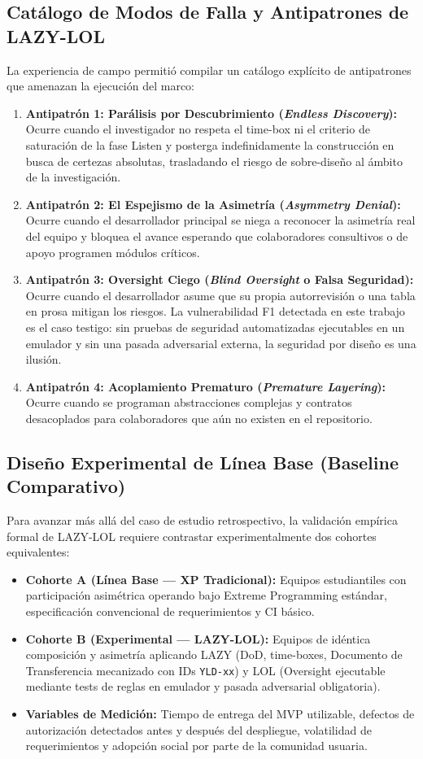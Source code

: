 \documentclass[14pt,a4paper,oneside]{extbook}
\begin{document}
\subsection{Catálogo de Modos de Falla y Antipatrones de LAZY-LOL}

La experiencia de campo permitió compilar un catálogo explícito de antipatrones que amenazan la ejecución del marco:
\begin{enumerate}
\item \textbf{Antipatrón 1: Parálisis por Descubrimiento (\textit{Endless Discovery}):} Ocurre cuando el investigador no respeta el time-box ni el criterio de saturación de la fase Listen y posterga indefinidamente la construcción en busca de certezas absolutas, trasladando el riesgo de sobre-diseño al ámbito de la investigación.
\item \textbf{Antipatrón 2: El Espejismo de la Asimetría (\textit{Asymmetry Denial}):} Ocurre cuando el desarrollador principal se niega a reconocer la asimetría real del equipo y bloquea el avance esperando que colaboradores consultivos o de apoyo programen módulos críticos.
\item \textbf{Antipatrón 3: Oversight Ciego (\textit{Blind Oversight} o Falsa Seguridad):} Ocurre cuando el desarrollador asume que su propia autorrevisión o una tabla en prosa mitigan los riesgos. La vulnerabilidad F1 detectada en este trabajo es el caso testigo: sin pruebas de seguridad automatizadas ejecutables en un emulador y sin una pasada adversarial externa, la seguridad por diseño es una ilusión.
\item \textbf{Antipatrón 4: Acoplamiento Prematuro (\textit{Premature Layering}):} Ocurre cuando se programan abstracciones complejas y contratos desacoplados para colaboradores que aún no existen en el repositorio.
\end{enumerate}

\subsection{Diseño Experimental de Línea Base (Baseline Comparativo)}

Para avanzar más allá del caso de estudio retrospectivo, la validación empírica formal de LAZY-LOL requiere contrastar experimentalmente dos cohortes equivalentes:
\begin{itemize}
\item \textbf{Cohorte A (Línea Base — XP Tradicional):} Equipos estudiantiles con participación asimétrica operando bajo Extreme Programming estándar, especificación convencional de requerimientos y CI básico.
\item \textbf{Cohorte B (Experimental — LAZY-LOL):} Equipos de idéntica composición y asimetría aplicando LAZY (DoD, time-boxes, Documento de Transferencia mecanizado con IDs \texttt{YLD-xx}) y LOL (Oversight ejecutable mediante tests de reglas en emulador y pasada adversarial obligatoria).
\item \textbf{Variables de Medición:} Tiempo de entrega del MVP utilizable, defectos de autorización detectados antes y después del despliegue, volatilidad de requerimientos y adopción social por parte de la comunidad usuaria.
\end{itemize}
\end{document}

